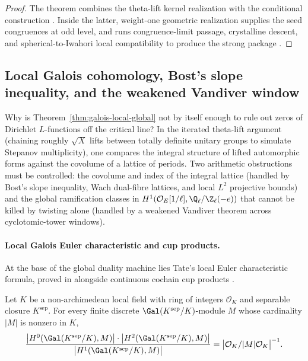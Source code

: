\begin{proof}
The theorem combines the theta-lift kernel realization
 with the conditional construction
. Inside the
latter, weight-one geometric realization
 supplies the seed congruences
at odd level, and
 runs
congruence-limit passage, crystalline descent, and spherical-to-Iwahori local
compatibility to produce the strong package
.
\end{proof}

\subsection{Local Galois cohomology, Bost's slope inequality, and the weakened Vandiver window}

Why is Theorem~\ref{thm:galois-local-global} not by itself enough to rule out
zeros of Dirichlet $L$-functions off the critical line? In the iterated
theta-lift argument (chaining roughly $\sqrt{X}$ lifts between totally definite
unitary groups to simulate Stepanov multiplicity), one compares the integral
structure of lifted automorphic forms against the covolume of a lattice of
periods. Two arithmetic obstructions must be controlled: the covolume and
index of the integral lattice (handled by Bost's slope inequality, Wach
dual-fibre lattices, and local $L^2$ projective bounds) and the global
ramification classes in $H^1(\mathcal{O}_E[1/\ell], \Q_\ell/\Z_\ell(-e))$
that cannot be killed by twisting alone (handled by a weakened Vandiver
theorem across cyclotomic-tower windows).

\paragraph{Local Galois Euler characteristic and cup products.}
At the base of the global duality machine lies Tate's local Euler
characteristic formula, proved in 
alongside continuous cochain cup products .

\begin{theorem}
\label{thm:local-euler-char}
Let $K$ be a non-archimedean local field with ring of integers $\mathcal{O}_K$
and separable closure $K^{\mathrm{sep}}$. For every finite discrete
$\Gal(K^{\mathrm{sep}}/K)$-module $M$ whose cardinality $|M|$ is nonzero in
$K$,
\[
  \frac{\bigl|H^0(\Gal(K^{\mathrm{sep}}/K), M)\bigr| \cdot
        \bigl|H^2(\Gal(K^{\mathrm{sep}}/K), M)\bigr|}
       {\bigl|H^1(\Gal(K^{\mathrm{sep}}/K), M)\bigr|}
  = \bigl|\mathcal{O}_K / |M|\mathcal{O}_K\bigr|^{-1}.
\]
\end{theorem}

